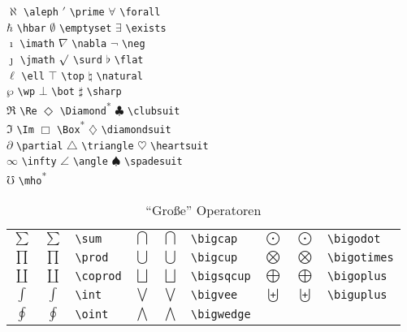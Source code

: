 \begin{table}[!htbp]
\caption[Verschiedene sonstige Symbole]%
        {Verschiedene sonstige Symbole
         (* benötigt Paket \texttt{latexsym})}
\begin{symbols}
$\aleph $\> \verb|\aleph| \>$\prime $\> \verb|\prime| \>
$\forall $\> \verb|\forall|  \\
$\hbar $\> \verb|\hbar| \>$\emptyset $\> \verb|\emptyset| \>
$\exists $\> \verb|\exists|  \\
$\imath $\> \verb|\imath| \>$\nabla $\> \verb|\nabla| \>
$\neg $\> \verb|\neg|  \\
$\jmath $\> \verb|\jmath| \>$\surd $\> \verb|\surd| \>
$\flat $\> \verb|\flat| \\
$\ell $\> \verb|\ell| \>$\top $\> \verb|\top| \>
$\natural $\> \verb|\natural| \\
$\wp $\> \verb|\wp| \>$\bot $\> \verb|\bot| \>$\sharp $\> \verb|\sharp| \\
$\Re $\> \verb|\Re| \>$\Diamond $\> \verb|\Diamond|\textsuperscript{*} \>$\clubsuit $\> \verb|\clubsuit| \\
$\Im $\> \verb|\Im| \>$\Box $\> \verb|\Box|\textsuperscript{*} \>$\diamondsuit $\>
\verb|\diamondsuit| \\
$\partial $\> \verb|\partial| \>$\triangle $\> \verb|\triangle| \>
$\heartsuit $\> \verb|\heartsuit| \\
$\infty $\> \verb|\infty| \>$\angle $\> \verb|\angle| \>
$\spadesuit $\> \verb|\spadesuit| \\
$\mho $\> \verb|\mho|\textsuperscript{*} \\
\end{symbols}
\end{table}


\begin{table}[!htbp]
\caption{"`Große"' Operatoren}
\begin{trivlist}\item
\begin{tabular}{@{}ccl@{\qquad}cll@{\qquad}ccl@{}}
$\sum$     & $\displaystyle \sum$    & \verb|\sum|
  & $\bigcap$    & $\displaystyle\bigcap$    & \verb|\bigcap|
  & $\bigodot$   & $\displaystyle\bigodot$   & \verb|\bigodot| \\[6pt]
$\prod$    & $\displaystyle\prod$    & \verb|\prod|
  & $\bigcup$    & $\displaystyle\bigcup$    & \verb|\bigcup|
  & $\bigotimes$ & $\displaystyle\bigotimes$ & \verb|\bigotimes| \\[6pt]
$\coprod$  & $\displaystyle\coprod$  & \verb|\coprod|
  & $\bigsqcup$  & $\displaystyle\bigsqcup$  & \verb|\bigsqcup|
  & $\bigoplus$  & $\displaystyle\bigoplus$  & \verb|\bigoplus| \\[6pt]
$\int$     & $\displaystyle\int$     & \verb|\int|
  & $\bigvee$    & $\displaystyle\bigvee$    & \verb|\bigvee|
  & $\biguplus$  & $\displaystyle\biguplus$  & \verb|\biguplus| \\[6pt]
$\oint$    & $\displaystyle\oint$    & \verb|\oint|
  & $\bigwedge$  & $\displaystyle\bigwedge$  & \verb|\bigwedge|
\end{tabular}
\end{trivlist}
\end{table}



